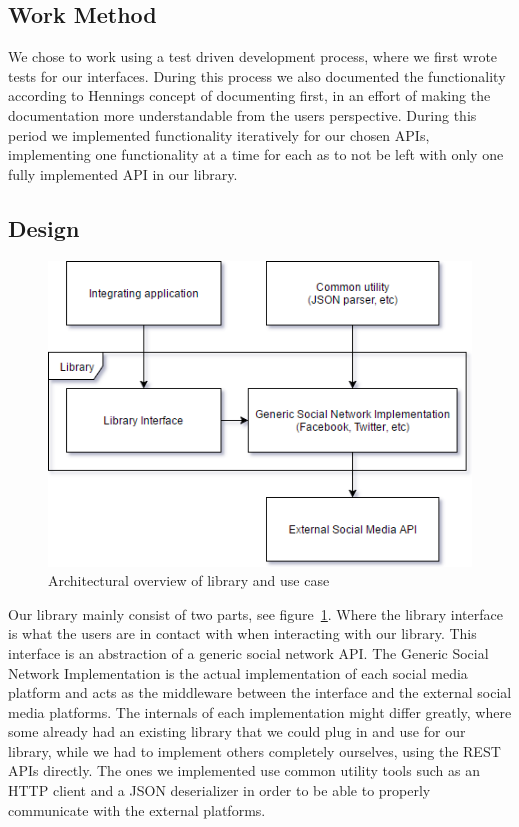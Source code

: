 \documentclass{sigchi-alternate}
\begin{document}
\subsection{Work Method}
We chose to work using a test driven development process, where we first wrote tests for our interfaces. During this process we also documented the functionality according to 
Hennings\autocite{Henning:2007:ADM:1255421.1255422} concept of documenting first, in an effort of making the documentation more understandable from the users perspective. During this
period we implemented functionality iteratively for our chosen APIs, implementing one functionality at a time for each as to not be left with only one fully implemented API in our library.

\subsection{Design}
\begin{figure}
	\includegraphics[width=\columnwidth]{LibraryImplementation.png}
	\caption{Architectural overview of library and use case}
	\label{fig:architecturalOverview}
\end{figure}
Our library mainly consist of two parts, see figure~\ref{fig:architecturalOverview}. Where the library interface is what the users are in contact with when interacting with our library. This interface is an abstraction
of a generic social network API. The Generic Social Network Implementation is the actual implementation of each social media platform and acts as the middleware between the interface and the 
external social media platforms.
The internals of each implementation might differ greatly, where some already had an existing library that we could plug in and use for our library, while we had to implement others completely
ourselves, using the REST APIs directly. The ones we implemented use common utility tools such as an HTTP client and a JSON deserializer in order to be able to properly communicate with the external
platforms.
\end{document}

